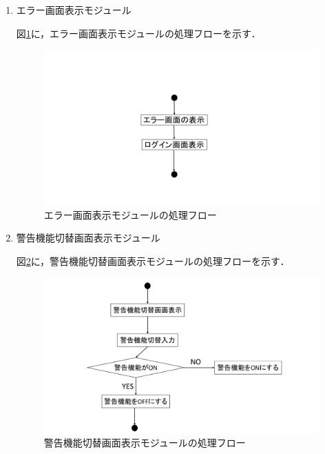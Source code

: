 \begin{enumerate}
\item エラー画面表示モジュール

図\ref{fig;2-4}に，エラー画面表示モジュールの処理フローを示す．

\begin{figure}[H]
	\begin{center}
	\includegraphics[width=15cm, bb=0 0 1000 540, clip]{./app_pic/app2-4.pdf}
	\caption{エラー画面表示モジュールの処理フロー}
	\label{fig;2-4}
	\end{center}
\end{figure}

\item 警告機能切替画面表示モジュール

図\ref{fig;2-5}に，警告機能切替画面表示モジュールの処理フローを示す．

\begin{figure}[H]
	\begin{center}
	\includegraphics[width=15cm, bb=0 0 1000 540, clip]{./app_pic/app2-5.pdf}
	\caption{警告機能切替画面表示モジュールの処理フロー}
	\label{fig;2-5}
	\end{center}
\end{figure}



\end{enumerate}
